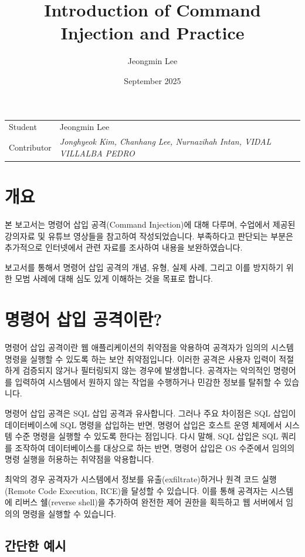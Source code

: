 \documentclass{article}
\title{Introduction of Command Injection and Practice}
\author{Jeongmin Lee}
\date{September 2025}
\begin{document}
\maketitle

\noindent\begin{tabular}{@{}ll}
  Student & Jeongmin Lee\\
  Contributor & \textit{Jonghyeok Kim, Chanhang Lee, Nurnazihah Intan, VIDAL VILLALBA PEDRO}\\
\end{tabular}

\section*{개요}
본 보고서는 명령어 삽입 공격(Command Injection)에 대해 다루며, 수업에서 제공된 강의자료 및 유튜브 영상들을 참고하여 작성되었습니다.
부족하다고 판단되는 부분은 추가적으로 인터넷에서 관련 자료를 조사하여 내용을 보완하였습니다. 

보고서를 통해서 명령어 삽입 공격의 개념, 유형, 실제 사례, 그리고 이를 방지하기 위한 모범 사례에 대해 심도 있게 이해하는 것을 목표로 합니다.

\section*{명령어 삽입 공격이란?}
명령어 삽입 공격이란 웹 애플리케이션의 취약점을 악용하여 공격자가 임의의 시스템 명령을 실행할 수 있도록 하는 보안 취약점입니다.
이러한 공격은 사용자 입력이 적절하게 검증되지 않거나 필터링되지 않는 경우에 발생합니다. 
공격자는 악의적인 명령어를 입력하여 시스템에서 원하지 않는 작업을 수행하거나 민감한 정보를 탈취할 수 있습니다.

명령어 삽입 공격은 SQL 삽입 공격과 유사합니다. 그러나 주요 차이점은 SQL 삽입이 데이터베이스에 SQL 명령을 삽입하는 반면, 
명령어 삽입은 호스트 운영 체제에서 시스템 수준 명령을 실행할 수 있도록 한다는 점입니다. 
다시 말해, SQL 삽입은 SQL 쿼리를 조작하여 데이터베이스를 대상으로 하는 반면, 명령어 삽입은 OS 수준에서 임의의 명령 실행을 허용하는 취약점을 악용합니다.

최악의 경우 공격자가 시스템에서 정보를 유출(exfiltrate)하거나 원격 코드 실행(Remote Code Execution, RCE)을 달성할 수 있습니다.
이를 통해 공격자는 시스템에 리버스 쉘(reverse shell)을 추가하여 완전한 제어 권한을 획득하고 웹 서버에서 임의의 명령을 실행할 수 있습니다.

\subsection*{간단한 예시}
\end{document}
